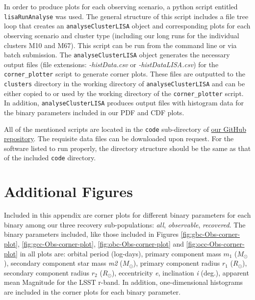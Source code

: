 \documentclass[twocolumn]{aastex63}
\begin{document}
In order to produce plots for each observing scenario, a python script entitled \texttt{lisaRunAnalyse} was used. The general structure of this script includes a file tree loop that creates an \texttt{analyseClusterLISA} object and corresponding plots for each observing scenario and cluster type (including our long runs for the individual clusters M10 and M67). This script can be run from the command line or via batch submission. The \texttt{analyseClusterLISA} object generates the necessary output files (file extensions: \textit{-histData.csv} or \textit{-histDataLISA.csv}) for the \texttt{corner\_plotter} script to generate corner plots. These files are outputted to the \texttt{clusters} directory in the working directory of \texttt{analyseClusterLISA} and can be either copied to or used by the working directory of the \texttt{corner\_plotter} script. In addition, \texttt{analyseClusterLISA} produces output files with histogram data for the binary parameters included in our PDF and CDF plots. 

All of the mentioned scripts are located in the \texttt{code} sub-directory of \href{https://github.com/andrewbowen19/ClusterEclipsingBinaries}{our GitHub repository}. The requisite data files can be downloaded upon request. For the software listed to run properly, the directory structure should be the same as that of the included \texttt{code} directory. 

\section{Additional Figures}
\label{app:Appendix B}
Included in this appendix are corner plots for different binary parameters for each binary among our three recovery sub-populations: \textit{all}, \textit{observable}, \textit{recovered}. The binary parameters included, like those included in Figures \ref{fig:gbc-Obs-corner-plot}, \ref{fig:gcc-Obs-corner-plot}, \ref{fig:obc-Obs-corner-plot} and \ref{fig:occ-Obs-corner-plot} in all plots are: orbital period (log-days), primary component mass \textit{$m_1$} ($M_{\odot}$), secondary component star mass \textit{m2} ($M_{\odot}$), primary component radius $r_1$ ($R_{\odot}$), secondary component radius $r_2$ ($R_{\odot}$), eccentricity \textit{e}, inclination \textit{i} (deg.), apparent mean Magnitude for the LSST r-band. In addition, one-dimensional histograms are included in the corner plots for each binary parameter.\\
\end{document}
